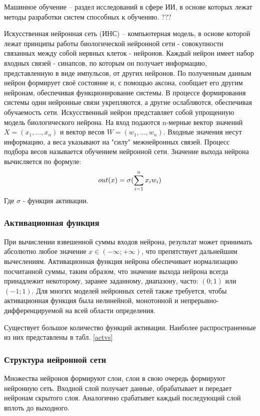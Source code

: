 Машинное обучение – раздел исследований в сфере ИИ, в основе которых лежат методы разработки систем способных к обучению. ???

Искусственная нейронная сеть (ИНС) – компьютерная модель, в основе которой лежат принципы работы биологической нейронной сети - совокупности связанных между собой нервных клеток - нейронов. Каждый нейрон имеет набор входных связей - синапсов, по которым он получает информацию, представленную в виде импульсов, от других нейронов. По полученным данным нейрон формирует своё состояние и, с помощью аксона, сообщает его другим нейронам, обеспечивая функционирование системы. В процессе формирования системы одни нейронные связи укрепляются, а другие ослабляются, обеспечивая обучаемость сети.
Искусственный нейрон представляет собой упрощенную модель биологического нейрона. На вход подаются n-мерные вектор значений $X=(x_{1},...,x_{n})$ и вектор весов $W=(w_{1},...,w_{n})$. Входные значения несут информацию, а веса указывают на "силу" межнейронных связей. Процесс подбора весов называется обучением нейронной сети. Значение выхода нейрона вычисляется по формуле: 
\[
  out(x)=\sigma(\sum_{\mathclap{i=1}}^{n} x_{i}w_{i})
\]
Где $\sigma$ - функция активации.

\subsubsection{Активационная функция}
При вычислении взвешенной суммы входов нейрона, результат может принимать абсолютно любое значение $x\in(-\infty;+\infty)$, что препятствует дальнейшим вычеслениям.
Активационная функция нейрона обеспечивает нормализацию посчитанной суммы, таким образом, что значение выхода нейрона всегда принадлежит некоторому, заранее заданному, диапазону, часто: $(0;1)$ или $(-1;1)$. Для многих моделей нейронных сетей также требуется, чтобы активационная функция была нелинейной, монотонной и непрерывно-дифференцируемой на всей области определения.

Существует большое количество функций активации. Наиболее распространенные из них представлены в табл. \ref{actvs}



\subsubsection{Структура нейронной сети}
Множества нейронов формируют слои, слои в свою очередь формируют нейронную сеть. Входной слой получает данные, обрабатывает и передает нейронам скрытого слоя. Аналогично срабатывет каждый последующий слой вплоть до выходного. 

